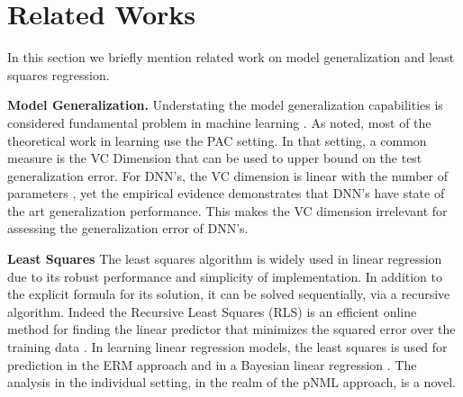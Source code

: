 \documentclass[conference,letterpaper]{IEEEtran}
\begin{document}
\section{Related Works} \label{sec:related_works}
In this section we briefly mention related work on model generalization and least squares regression.





\textbf{Model Generalization.} 
Understating the model generalization capabilities is considered fundamental problem in machine learning  \cite{vapnik2013nature}. 
As noted, most of the theoretical work in learning use the PAC setting. In that setting, a common measure is the VC Dimension that can be used to upper bound on the test generalization error.
For DNN's, the VC dimension is linear with the number of parameters \cite{sontag1998vc}, yet the empirical evidence demonstrates that DNN's have state of the art generalization performance. This makes the VC dimension irrelevant for assessing the generalization error of DNN's.

\textbf{Least Squares}
The least squares algorithm is widely used in linear regression due to its robust performance and simplicity of implementation.
In addition to the explicit formula for its solution, it can be solved sequentially, via a recursive algorithm.
Indeed the Recursive Least Squares (RLS) is an efficient online method for finding the linear predictor that minimizes the squared error over the training data \cite{hayes19969}.
In learning linear regression models, the least squares is used for prediction in the ERM approach and in a Bayesian linear regression \cite{fornalski2015applications}. 
The analysis in the individual setting, in the realm of the pNML approach, is a novel.
\end{document}
